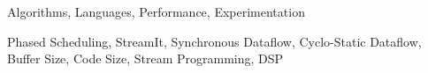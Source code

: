 
\begin{terms}
Algorithms, Languages, Performance, Experimentation
\end{terms}

\begin{keywords}
Phased Scheduling, StreamIt, Synchronous Dataflow, Cyclo-Static Dataflow, Buffer Size, Code Size, Stream Programming, DSP
\end{keywords}
\vspace{6pt}
